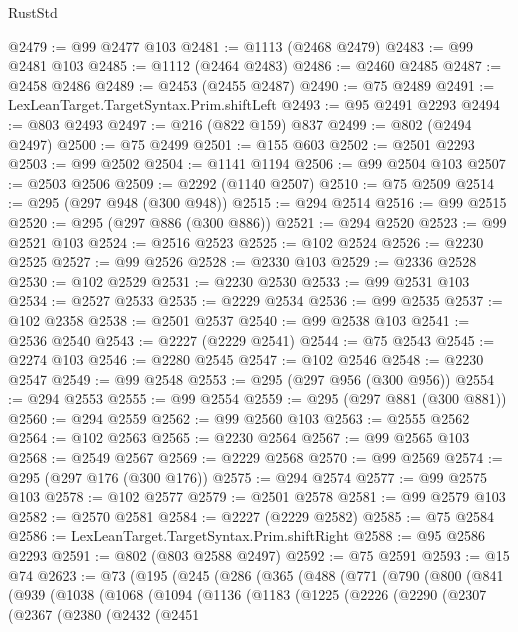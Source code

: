 \begin{lexlean}{RustStd}
\begin{coremodule}
@2479 := @99 @2477 @103
@2481 := @1113 (@2468 @2479)
@2483 := @99 @2481 @103
@2485 := @1112 (@2464 @2483)
@2486 := @2460 @2485
@2487 := @2458 @2486
@2489 := @2453 (@2455 @2487)
@2490 := @75 @2489
@2491 := LexLeanTarget.TargetSyntax.Prim.shiftLeft
@2493 := @95 @2491 @2293
@2494 := @803 @2493
@2497 := @216 (@822 @159) @837
@2499 := @802 (@2494 @2497)
@2500 := @75 @2499
@2501 := @155 @603
@2502 := @2501 @2293
@2503 := @99 @2502
@2504 := @1141 @1194
@2506 := @99 @2504 @103
@2507 := @2503 @2506
@2509 := @2292 (@1140 @2507)
@2510 := @75 @2509
@2514 := @295 (@297 @948 (@300 @948))
@2515 := @294 @2514
@2516 := @99 @2515
@2520 := @295 (@297 @886 (@300 @886))
@2521 := @294 @2520
@2523 := @99 @2521 @103
@2524 := @2516 @2523
@2525 := @102 @2524
@2526 := @2230 @2525
@2527 := @99 @2526
@2528 := @2330 @103
@2529 := @2336 @2528
@2530 := @102 @2529
@2531 := @2230 @2530
@2533 := @99 @2531 @103
@2534 := @2527 @2533
@2535 := @2229 @2534
@2536 := @99 @2535
@2537 := @102 @2358
@2538 := @2501 @2537
@2540 := @99 @2538 @103
@2541 := @2536 @2540
@2543 := @2227 (@2229 @2541)
@2544 := @75 @2543
@2545 := @2274 @103
@2546 := @2280 @2545
@2547 := @102 @2546
@2548 := @2230 @2547
@2549 := @99 @2548
@2553 := @295 (@297 @956 (@300 @956))
@2554 := @294 @2553
@2555 := @99 @2554
@2559 := @295 (@297 @881 (@300 @881))
@2560 := @294 @2559
@2562 := @99 @2560 @103
@2563 := @2555 @2562
@2564 := @102 @2563
@2565 := @2230 @2564
@2567 := @99 @2565 @103
@2568 := @2549 @2567
@2569 := @2229 @2568
@2570 := @99 @2569
@2574 := @295 (@297 @176 (@300 @176))
@2575 := @294 @2574
@2577 := @99 @2575 @103
@2578 := @102 @2577
@2579 := @2501 @2578
@2581 := @99 @2579 @103
@2582 := @2570 @2581
@2584 := @2227 (@2229 @2582)
@2585 := @75 @2584
@2586 := LexLeanTarget.TargetSyntax.Prim.shiftRight
@2588 := @95 @2586 @2293
@2591 := @802 (@803 @2588 @2497)
@2592 := @75 @2591
@2593 := @15 @74
@2623 := @73
    (@195
      (@245
        (@286
          (@365
            (@488
              (@771
                (@790
                  (@800
                    (@841
                      (@939
                        (@1038
                          (@1068
                            (@1094
                              (@1136
                                (@1183
                                  (@1225
                                    (@2226
                                      (@2290
                                        (@2307
                                          (@2367
                                            (@2380
                                              (@2432
                                                (@2451

\end{coremodule}
\end{lexlean}
